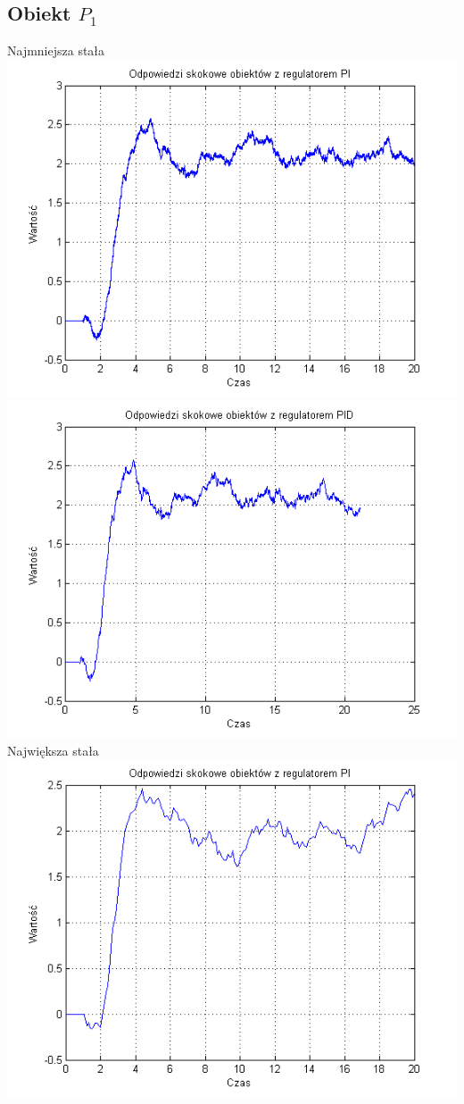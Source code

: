 \documentclass[10pt,a4paper]{article}
\begin{document}
\subsection*{Obiekt $P_1$}
Najmniejsza stała\\
\includegraphics[scale=1]{images/trzy/skrypt_01.png}\\
\includegraphics[scale=1]{images/cztery/skrypt_01.png}\\ 
Największa stała\\
\includegraphics[scale=1]{images/trzy/skrypt_02.png}\\
\end{document}
